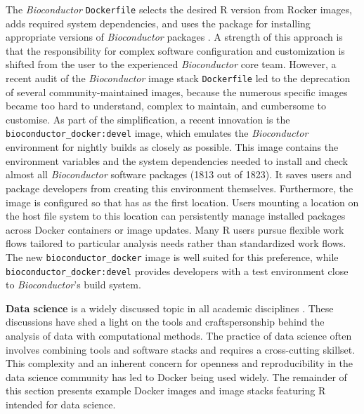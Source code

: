 The \emph{Bioconductor} \texttt{Dockerfile} selects the desired R
version from Rocker images, adds required system dependencies, and uses
the  package for installing appropriate versions of
\emph{Bioconductor} packages \citep{cran_biocmanager}. A strength of
this approach is that the responsibility for complex software
configuration and customization is shifted from the user to the
experienced \emph{Bioconductor} core team. However, a recent audit of
the \emph{Bioconductor} image stack \texttt{Dockerfile} led to the
deprecation of several community-maintained images, because the numerous
specific images became too hard to understand, complex to maintain, and
cumbersome to customise. As part of the simplification, a recent
innovation is the \texttt{bioconductor\_docker:devel} image, which
emulates the \emph{Bioconductor} environment for nightly builds as
closely as possible. This image contains the environment variables and
the system dependencies needed to install and check almost all
\emph{Bioconductor} software packages (1813 out of 1823). It saves users
and package developers from creating this environment themselves.
Furthermore, the image is configured so that  has
 as the first location. Users
mounting a location on the host file system to this location can
persistently manage installed packages across Docker containers or image
updates. Many R users pursue flexible work flows tailored to particular
analysis needs rather than standardized work flows. The new
\texttt{bioconductor\_docker} image is well suited for this preference,
while \texttt{bioconductor\_docker:devel} provides developers with a
test environment close to \emph{Bioconductor}'s build system.

\label{datascience} \textbf{Data science} is a widely discussed topic in
all academic disciplines \citep[e.g.,][]{donoho_50_2017}. These
discussions have shed a light on the tools and craftspersonship behind
the analysis of data with computational methods. The practice of data
science often involves combining tools and software stacks and requires
a cross-cutting skillset. This complexity and an inherent concern for
openness and reproducibility in the data science community has led to
Docker being used widely. The remainder of this section presents example
Docker images and image stacks featuring R intended for data science.

